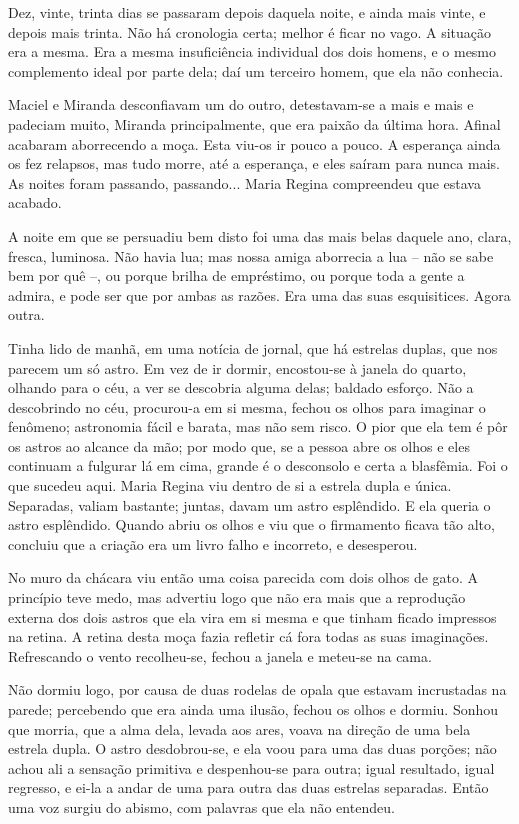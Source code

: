 Dez, vinte, trinta dias se passaram depois daquela noite, e ainda mais
vinte, e depois mais trinta. Não há cronologia certa; melhor é ficar no
vago. A situação era a mesma. Era a mesma insuficiência individual dos
dois homens, e o mesmo complemento ideal por parte dela; daí um terceiro
homem, que ela não conhecia.

Maciel e Miranda desconfiavam um do outro, detestavam-se a mais e mais e
padeciam muito, Miranda principalmente, que era paixão da última hora.
Afinal acabaram aborrecendo a moça. Esta viu-os ir pouco a pouco. A
esperança ainda os fez relapsos, mas tudo morre, até a esperança, e eles
saíram para nunca mais. As noites foram passando, passando... Maria
Regina compreendeu que estava acabado.

A noite em que se persuadiu bem disto foi uma das mais belas daquele
ano, clara, fresca, luminosa. Não havia lua; mas nossa amiga aborrecia a
lua -- não se sabe bem por quê --, ou porque brilha de empréstimo, ou
porque toda a gente a admira, e pode ser que por ambas as razões. Era
uma das suas esquisitices. Agora outra.

Tinha lido de manhã, em uma notícia de jornal, que há estrelas duplas,
que nos parecem um só astro. Em vez de ir dormir, encostou-se à janela
do quarto, olhando para o céu, a ver se descobria alguma delas; baldado
esforço. Não a descobrindo no céu, procurou-a em si mesma, fechou os
olhos para imaginar o fenômeno; astronomia fácil e barata, mas não sem
risco. O pior que ela tem é pôr os astros ao alcance da mão; por modo
que, se a pessoa abre os olhos e eles continuam a fulgurar lá em cima,
grande é o desconsolo e certa a blasfêmia. Foi o que sucedeu aqui. Maria
Regina viu dentro de si a estrela dupla e única. Separadas, valiam
bastante; juntas, davam um astro esplêndido. E ela queria o astro
esplêndido. Quando abriu os olhos e viu que o firmamento ficava tão
alto, concluiu que a criação era um livro falho e incorreto, e
desesperou.

No muro da chácara viu então uma coisa parecida com dois olhos de gato.
A princípio teve medo, mas advertiu logo que não era mais que a
reprodução externa dos dois astros que ela vira em si mesma e que tinham
ficado impressos na retina. A retina desta moça fazia refletir cá fora
todas as suas imaginações. Refrescando o vento recolheu-se, fechou a
janela e meteu-se na cama.

Não dormiu logo, por causa de duas rodelas de opala que estavam
incrustadas na parede; percebendo que era ainda uma ilusão, fechou os
olhos e dormiu. Sonhou que morria, que a alma dela, levada aos ares,
voava na direção de uma bela estrela dupla. O astro desdobrou-se, e ela
voou para uma das duas porções; não achou ali a sensação primitiva e
despenhou-se para outra; igual resultado, igual regresso, e ei-la a
andar de uma para outra das duas estrelas separadas. Então uma voz
surgiu do abismo, com palavras que ela não entendeu.

